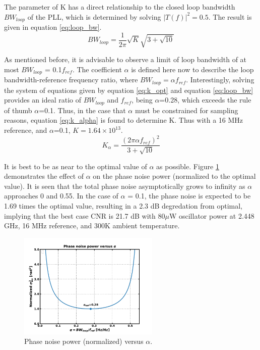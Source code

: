 			The parameter of K has a direct relationship to the closed loop bandwidth $BW_{loop}$ of the PLL, which is determined by solving $|T(f)|^2 = 0.5$. The result is given in equation \ref{eq:loop_bw}. 
			\begin{equation}\label{eq:loop_bw} 
				BW_{loop} = \frac{1}{2\pi}\sqrt{K}\sqrt{3+
				\sqrt{10}} 
			\end{equation} 

			As mentioned before, it is advisable to observe a limit of loop bandwidth of at most $BW_{loop}$ = 0.1$f_{ref}$. The coefficient $\alpha$ is defined here now to describe the loop bandwidth-reference frequency ratio, where $BW_{loop} = \alpha f_{ref}$. Interestingly, solving the system of equations given by equation \ref{eq:k_opt} and equation \ref{eq:loop_bw} provides an ideal ratio of $BW_{loop}$ and $f_{ref}$, being $\alpha$=0.28, which exceeds the rule of thumb $\alpha$=0.1. Thus, in the case that $\alpha$ must be constrained for sampling reasons, equation \ref{eq:k_alpha} is found to determine K. Thus with a 16 MHz reference, and $\alpha$=0.1, $K=1.64\times10^{13}$. 
			\begin{equation}\label{eq:k_alpha} 
				K_\alpha = \frac{(2\pi\alpha f_{ref})^2}{3
				+ \sqrt{10}} 
			\end{equation}

			It is best to be as near to the optimal value of $\alpha$ as possible. Figure \ref{fig:alpha_v_pn} demonstrates the effect of $\alpha$ on the phase noise power (normalized to the optimal value). It is seen that the total phase noise asymptotically grows to infinity as $\alpha$ approaches 0 and 0.55. In the case of $\alpha$ = 0.1, the phase noise is expected to be 1.69 times the optimal value, resulting in a 2.3 dB degredation from optimal, implying that the best case CNR is 21.7 dB with 80$\mu$W oscillator power at 2.448 GHz, 16 MHz reference, and 300K ambient temperature.

			\begin{figure}[htb!]
				\center\includegraphics[width=0.6\textwidth, angle=0]{./figs/design/alpha_v_pn}
				\caption{Phase noise power (normalized) versus $\alpha$.}
				\label{fig:alpha_v_pn}
			\end{figure}

